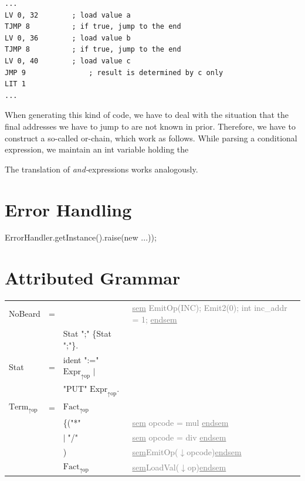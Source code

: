 \documentclass[11pt]{report}
\newcommand{\leongage}{NoBeard}
\newcommand{\alternative}{$\mid \;$}
\newenvironment{atg}[1][6cm]
	{\begin{tabular}[b]{lclp{#1}}}
	{\end{tabular}}
\newcommand{\atgsy}[2]{$\textrm{#1}_\textrm{#2}$}
\newcommand{\outattr}{$\uparrow$}
\newcommand{\inattr}{$\downarrow$}
\newcommand{\semantics}[1]{\textcolor{Gray}{#1}}
\newenvironment {sem}
	{\underline{sem}}
	{\underline{endsem}}
\begin{document}

\begin{lstlisting}[float,caption={Assembler code of or-chain}, captionpos=b,label=cod:orchain]
...
LV 0, 32		; load value a
TJMP 8			; if true, jump to the end
LV 0, 36		; load value b
TJMP 8			; if true, jump to the end
LV 0, 40		; load value c
JMP 9				; result is determined by c only
LIT 1
...
\end{lstlisting}
When generating this kind of code, we have to deal with the situation that the final addresses we have to jump to are not known in prior. Therefore, we have to construct a so-called or-chain, which work as follows. While parsing a conditional expression, we maintain an int variable holding the 

The translation of {\em and-}expressions works analogously.


\chapter{Error Handling}
ErrorHandler.getInstance().raise(new ...));

\chapter{Attributed Grammar}
\begin{atg}[4.5cm]
\leongage &=& & \semantics{\begin{sem} \newline EmitOp(INC); \newline Emit2(0); \newline int inc\_addr = 1; \newline \end{sem}}\\
&&Stat ";" \{Stat ";"\}. \\

Stat & = & ident ":=" \atgsy{Expr}{\outattr op}  \alternative \\
&& "PUT" \atgsy{Expr}{\outattr op}. \\

\atgsy{Term}{\outattr op} &=& \atgsy{Fact}{\outattr op}  \\
&& \{("*" &\semantics{\begin{sem} opcode = mul \end{sem}}\\
&& \alternative "/" & \semantics{\begin{sem} opcode = div \end{sem}}\\
&&) & \semantics{\begin{sem}EmitOp(\inattr opcode)\end{sem}}\\
&&\atgsy{Fact}{\outattr op} & \semantics{\begin{sem}LoadVal(\inattr op)\end{sem}}
\end{atg}

{}
\end{document}
